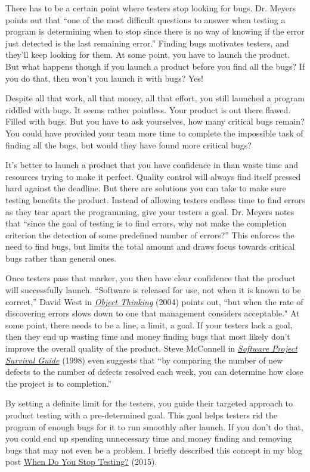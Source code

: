 \documentclass{main}
\begin{document}
There has to be a certain point where testers stop looking for bugs.
Dr. Meyers points out that ``one of the most difficult questions to answer
when testing a program is determining when to stop since there is no way
of knowing if the error just detected is the last remaining error.''
Finding bugs motivates testers, and they'll keep looking for them. At some point,
you have to launch the product. But what happens though if you launch a
product before you find all the bugs? If you do that, then won't you launch it with bugs?
Yes!

Despite all that work, all that money, all that effort, you still
launched a program riddled with bugs. It seems rather pointless. Your product
is out there flawed. Filled with bugs. But you have to ask yourselves, how many
critical bugs remain? You could have provided your team more time to
complete the impossible task of finding all the bugs, but would they have
found more critical bugs?

It's better to launch a product that you have confidence in than waste time
and resources trying to make it perfect. Quality control will always find
itself pressed hard against the deadline. But there are solutions you
can take to make sure testing benefits the product.
Instead of allowing testers endless time to find errors as they tear apart
the programming, give your testers a goal. Dr. Meyers notes that
``since the goal of testing is to find errors, why not make the completion
criterion the detection of some predefined number of errors?''
This enforces the need to find bugs, but limits the total amount and
draws focus towards critical bugs rather than general ones.

Once testers pass that marker, you then have clear confidence that the
product will successfully launch. ``Software is released for use, not when
it is known to be correct,'' David West in \href{https://amzn.to/2xsEhuz}{\emph{Object Thinking}} (2004) points out,
``but when the rate of discovering errors slows down to one that management
considers acceptable." At some point, there needs to be a line,
a limit, a goal. If your testers lack a goal, then they end up wasting
time and money finding bugs that most likely don't improve the overall
quality of the product.
Steve McConnell in \href{https://amzn.to/2JhnDCJ}{\emph{Software Project Survival Guide}} (1998) even suggests that
``by comparing the number of new defects to the number of defects
resolved each week, you can determine how close the project is to completion.''

By setting a definite limit for the testers, you guide their targeted approach
to product testing with a pre-determined goal. This goal helps testers rid
the program of enough bugs for it to run smoothly after launch. If
you don't do that, you could end up spending unnecessary time and money
finding and removing bugs that may not even be a problem. I briefly
described this concept in my blog post
\href{https://www.yegor256.com/2015/09/10/testing-exit-criteria.html}{When Do You Stop Testing?} (2015).
\end{document}
